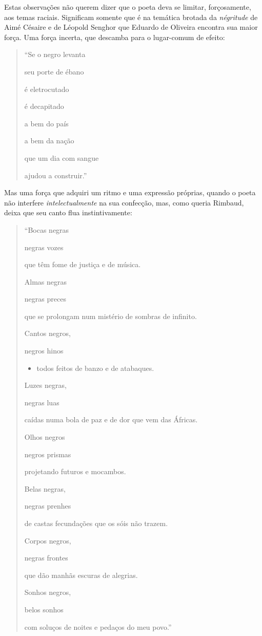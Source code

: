 \documentclass[
  letterpaper,
  DIV=11,
  numbers=noendperiod]{scrreprt}
\providecommand{\tightlist}{%
  \setlength{\itemsep}{0pt}\setlength{\parskip}{0pt}}\usepackage{longtable,booktabs,array}
\begin{document}
Estas observações não querem dizer que o poeta deva se limitar,
forçosamente, aos temas raciais. Significam somente que é na temática
brotada da \emph{négritude} de Aimé Césaire e de Léopold Senghor que
Eduardo de Oliveira encontra sua maior força. Uma força incerta, que
descamba para o lugar-comum de efeito:

\begin{quote}
``Se o negro levanta~

seu porte de ébano~

é eletrocutado~

é decapitado~

a bem do país~

a bem da nação~

que um dia com sangue~

ajudou a construir.''
\end{quote}

Mas uma força que adquiri um ritmo e uma expressão próprias, quando o
poeta não interfere \emph{intelectualmente} na sua confecção, mas, como
queria Rimbaud, deixa que seu canto flua instintivamente:

\begin{quote}
``Bocas negras~

negras vozes~

que têm fome de justiça e de música.~

Almas negras~

negras preces~

que se prolongam num mistério de sombras de infinito.~

Cantos negros,~

negros hinos~

\begin{itemize}
\tightlist
\item
  todos feitos de banzo e de atabaques.~
\end{itemize}

Luzes negras,~

negras luas~

caídas numa bola de paz e de dor que vem das Áfricas.~

Olhos negros~

negros prismas~

projetando futuros e mocambos.~

Belas negras,~

negras prenhes~

de castas fecundações que os sóis não trazem.~

Corpos negros,~

negras frontes~

que dão manhãs escuras de alegrias.~

Sonhos negros,~

belos sonhos~

com soluços de noites e pedaços do meu povo.''
\end{quote}
\end{document}
